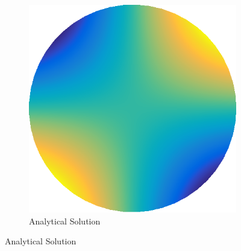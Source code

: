 \documentclass[../fem.tex]{subfile}
\begin{document}
\begin{figure}[htpb]
  \centering
  \begin{subfigure}{0.5\textwidth}
    \centering
    \includegraphics[width=0.8\linewidth]{figures/c1a/func.png}
    \caption{Analytical Solution}
  \end{subfigure}


\end{figure}
\end{document}
